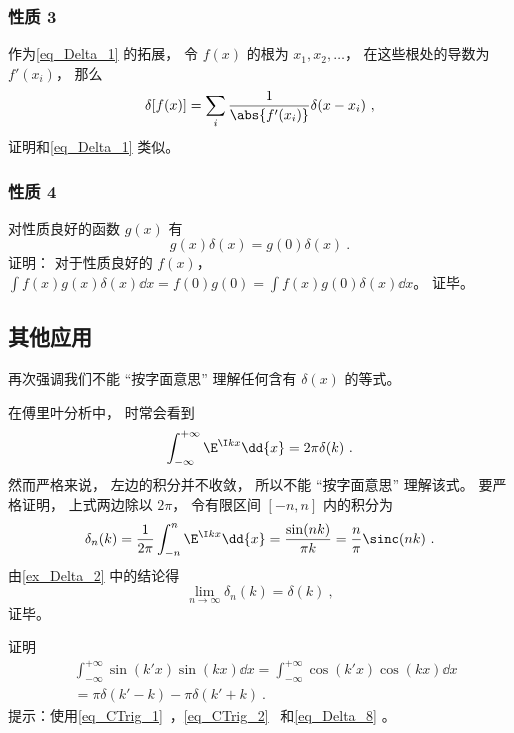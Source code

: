 \subsubsection{性质 3}
作为\autoref{eq_Delta_1} 的拓展， 令 $f(x)$ 的根为 $x_1, x_2, \dots$， 在这些根处的导数为 $f'(x_i)$， 那么
\begin{equation}\label{eq_Delta_12}
\delta[f(x)] = \sum_i \frac{1}{\abs{f'(x_i)}} \delta(x - x_i)~,
\end{equation}
证明和\autoref{eq_Delta_1} 类似。

\subsubsection{性质 4}
对性质良好的函数 $g(x)$ 有
\begin{equation}
g(x)\delta(x) = g(0)\delta(x)~.
\end{equation}
证明： 对于性质良好的 $f(x)$， $\int f(x) g(x)\delta(x) \dd{x} = f(0)g(0) = \int f(x)g(0)\delta(x) \dd{x}$。 证毕。

\subsection{其他应用}
再次强调我们不能 “按字面意思” 理解任何含有 $\delta(x)$ 的等式。
\begin{example}{}\label{ex_Delta_1}
在傅里叶分析中， 时常会看到
\begin{equation}\label{eq_Delta_8}
\int_{-\infty}^{+\infty} \E^{\I kx}\dd{x} = 2\pi \delta(k)~.
\end{equation}
然而严格来说， 左边的积分并不收敛， 所以不能 “按字面意思” 理解该式。 要严格证明， 上式两边除以 $2\pi$， 令有限区间 $[-n,n]$ 内的积分为
\begin{equation}
\delta_n(k) = \frac{1}{2\pi}\int_{-n}^{n} \E^{\I kx}\dd{x} = \frac{\sin(n k)}{\pi k} = \frac{n}{\pi} \sinc(n k)~.
\end{equation}
由\autoref{ex_Delta_2} 中的结论得
\begin{equation}
\lim_{n\to\infty} \delta_n(k) = \delta(k)~,
\end{equation}
证毕。
\end{example}

\begin{exercise}{}\label{exe_Delta_3}
证明
\begin{equation}\label{eq_Delta_9}
\begin{aligned}%
&\int_{-\infty}^{+\infty} \sin(k'x) \sin(kx) \dd{x} = \int_{-\infty}^{+\infty} \cos(k'x) \cos(kx) \dd{x}\\
&= \pi\delta(k' - k) - \pi\delta(k' + k)~.
\end{aligned}
\end{equation}
提示：使用\autoref{eq_CTrig_1}~，\autoref{eq_CTrig_2}~ 和\autoref{eq_Delta_8} 。
\end{exercise}

